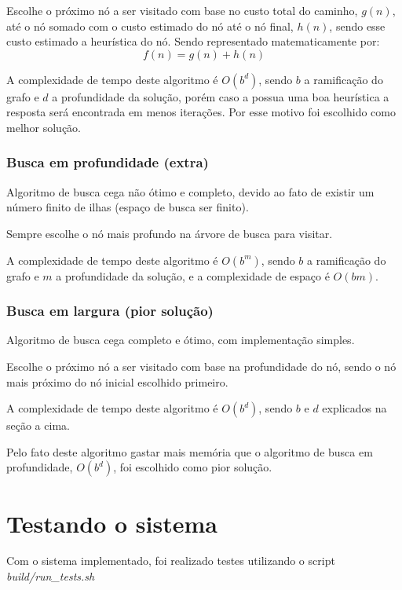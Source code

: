 \documentclass[12pt, a4paper]{article}
\begin{document}
Escolhe o próximo nó a ser visitado com base no custo total do caminho, \( g(n) \), até o nó somado com o custo estimado do nó até o nó final, \( h(n) \),
sendo esse custo estimado a heurística do nó. Sendo representado matematicamente por:
\begin{equation}
    f(n) = g(n) + h(n)
\end{equation}

A complexidade de tempo deste algoritmo é \( O(b^d) \), sendo \( b \) a ramificação do grafo e \( d \) a profundidade da solução,
porém caso a possua uma boa heurística a resposta será encontrada em menos iterações. Por esse motivo foi escolhido como melhor solução.

\subsubsection{Busca em profundidade (extra)}\label{sec:bp}
Algoritmo de busca cega não ótimo e completo, devido ao fato de existir um número finito de ilhas (espaço de busca ser finito).

Sempre escolhe o nó mais profundo na árvore de busca para visitar.

A complexidade de tempo deste algoritmo é \( O(b^m) \), sendo \( b \) a ramificação do grafo e \( m \) a profundidade da solução,
e a complexidade de espaço é \( O(bm) \).

\subsubsection{Busca em largura (pior solução)}\label{sec:bl}
Algoritmo de busca cega completo e ótimo, com implementação simples.

Escolhe o próximo nó a ser visitado com base na profundidade do nó,
sendo o nó mais próximo do nó inicial escolhido primeiro.

A complexidade de tempo deste algoritmo é \( O(b^d) \), sendo \( b \) e \( d \) explicados na seção  a cima.

Pelo fato deste algoritmo gastar mais memória que o algoritmo de busca em profundidade, \( O(b^d) \),
foi escolhido como pior solução.

\section{Testando o sistema}\label{sec:testes}
Com o sistema implementado, foi realizado testes utilizando o script \textit{build/run\_tests.sh}
\end{document}
